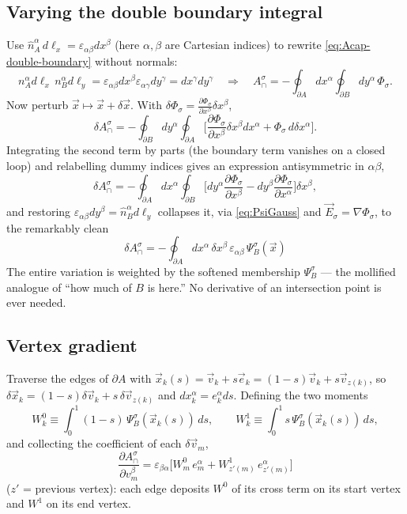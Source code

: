 \documentclass[11pt]{article}
\numberwithin{equation}{section}
\newcommand{\vv}[1]{\vec{#1}}
\newcommand{\eps}{\varepsilon}
\begin{document}
\subsection{Varying the double boundary integral}
Use $\hat n_A^\alpha\,d\ell_x=\eps_{\alpha\beta}dx^\beta$ (here $\alpha,\beta$ are Cartesian indices) to
rewrite \eqref{eq:Acap-double-boundary} without normals:
\[
  n_A^\alpha d\ell_x\,n_B^\alpha d\ell_y=\eps_{\alpha\beta}dx^\beta\eps_{\alpha\gamma}dy^\gamma
  =dx^\gamma dy^\gamma
  \quad\Longrightarrow\quad
  A_\cap^\sigma=-\oint_{\partial A}dx^\alpha\oint_{\partial B}dy^\alpha\,\Phi_\sigma .
\]
Now perturb $\vv x\mapsto\vv x+\delta\vv x$. With
$\delta\Phi_\sigma=\frac{\partial\Phi_\sigma}{\partial x^\beta}\delta x^\beta$,
\[
  \delta A_\cap^\sigma=-\oint_{\partial B}dy^\alpha\oint_{\partial A}
  \Big[\frac{\partial\Phi_\sigma}{\partial x^\beta}\delta x^\beta dx^\alpha
  +\Phi_\sigma\,d\delta x^\alpha\Big].
\]
Integrating the second term by parts (the boundary term vanishes on a closed loop) and relabelling
dummy indices gives an expression antisymmetric in $\alpha\beta$,
\[
  \delta A_\cap^\sigma=-\oint_{\partial A}dx^\alpha\oint_{\partial B}
  \Big[dy^\alpha\frac{\partial\Phi_\sigma}{\partial x^\beta}
  -dy^\beta\frac{\partial\Phi_\sigma}{\partial x^\alpha}\Big]\delta x^\beta ,
\]
and restoring $\eps_{\alpha\beta}dy^\beta=\hat n_B^\alpha d\ell_y$ collapses it, via \eqref{eq:PsiGauss}
and $\vv E_\sigma=\nabla\Phi_\sigma$, to the remarkably clean
\begin{equation}\label{eq:dAcap}
  \boxed{\;\delta A_\cap^\sigma=-\oint_{\partial A}dx^\alpha\,\delta x^\beta\,\eps_{\alpha\beta}\,
  \Psi_B^\sigma(\vv x)\;}
\end{equation}
The entire variation is weighted by the softened membership $\Psi_B^\sigma$ --- the mollified analogue
of ``how much of $B$ is here.'' No derivative of an intersection point is ever needed.

\subsection{Vertex gradient}
Traverse the edges of $\partial A$ with $\vv x_k(s)=\vv v_k+s\vv e_k=(1-s)\vv v_k+s\vv v_{z(k)}$, so
$\delta\vv x_k=(1-s)\delta\vv v_k+s\,\delta\vv v_{z(k)}$ and $dx_k^\alpha=e_k^\alpha ds$. Defining the
two moments
\begin{equation}\label{eq:W}
  W_k^{0}\equiv\int_0^1(1-s)\,\Psi_B^\sigma(\vv x_k(s))\,ds,\qquad
  W_k^{1}\equiv\int_0^1 s\,\Psi_B^\sigma(\vv x_k(s))\,ds,
\end{equation}
and collecting the coefficient of each $\delta\vv v_m$,
\begin{equation}\label{eq:gradA}
  \boxed{\;\frac{\partial A_\cap^\sigma}{\partial v_m^\beta}
  =\eps_{\beta\alpha}\Big[W_m^{0}\,e_m^\alpha+W_{z'(m)}^{1}\,e_{z'(m)}^\alpha\Big]\;}
\end{equation}
($z'$ = previous vertex): each edge deposits $W^0$ of its cross term on its start vertex and $W^1$ on
its end vertex.
\end{document}
